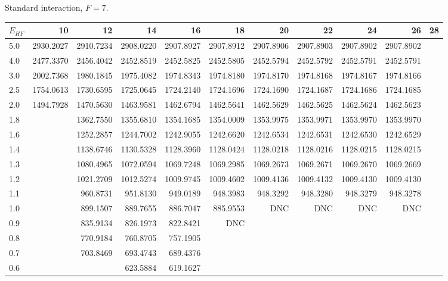\begin{landscape}
\begin{table}
\begin{center}
Standard interaction, $F=7$.\\
\begin{tabular}{l|rrrrrrrrrr}
\hline 
$E_{HF}$ & 10 & 12 & 14 & 16 & 18 & 20 & 22 & 24 & 26 & 28 \\
\hline \hline
5.0 & 2930.2027 & 2910.7234 & 2908.0220 & 2907.8927 & 2907.8912 & 2907.8906 & 2907.8903 & 2907.8902 & 2907.8902 & \\ 
4.0 & 2477.3370 & 2456.4042 & 2452.8519 & 2452.5825 & 2452.5805 & 2452.5794 & 2452.5792 & 2452.5791 & 2452.5791 & \\ 
3.0 & 2002.7368 & 1980.1845 & 1975.4082 & 1974.8343 & 1974.8180 & 1974.8170 & 1974.8168 & 1974.8167 & 1974.8166 & \\ 
2.5 & 1754.0613 & 1730.6595 & 1725.0645 & 1724.2140 & 1724.1696 & 1724.1690 & 1724.1687 & 1724.1686 & 1724.1685 & \\ 
2.0 & 1494.7928 & 1470.5630 & 1463.9581 & 1462.6794 & 1462.5641 & 1462.5629 & 1462.5625 & 1462.5624 & 1462.5623 & \\ 
1.8 & 			& 1362.7550 & 1355.6810 & 1354.1685 & 1354.0009 & 1353.9975 & 1353.9971 & 1353.9970 & 1353.9970 & \\ 
1.6 & 			& 1252.2857 & 1244.7002 & 1242.9055 & 1242.6620 & 1242.6534 & 1242.6531 & 1242.6530 & 1242.6529 & \\ 
1.4 & 			& 1138.6746 & 1130.5328 & 1128.3960 & 1128.0424 & 1128.0218 & 1128.0216 & 1128.0215 & 1128.0215 & \\ 
1.3 & 			& 1080.4965 & 1072.0594 & 1069.7248 & 1069.2985 & 1069.2673 & 1069.2671 & 1069.2670 & 1069.2669 & \\ 
1.2 & 			& 1021.2709 & 1012.5274 & 1009.9745 & 1009.4602 & 1009.4136 & 1009.4132 & 1009.4130 & 1009.4130 & \\ 
1.1 & 			&  960.8731 &  951.8130 &  949.0189 &  948.3983 &  948.3292 &  948.3280 &  948.3279 &  948.3278 & \\ 
1.0 & 			&  899.1507 &  889.7655 &  886.7047 &  885.9553 &       DNC &      DNC  &    DNC    &       DNC & \\ 
0.9 & 			&  835.9134 &  826.1973 &  822.8421 &       DNC  \\ 
0.8 & 			& 770.9184 & 760.8705 & 757.1905  \\ 
0.7 & 			& 703.8469 & 693.4743 & 689.4376  \\ 
0.6 & 			& 			& 623.5884 & 619.1627  \\ 

\end{tabular}
\end{center}
\end{table}
\end{landscape}
